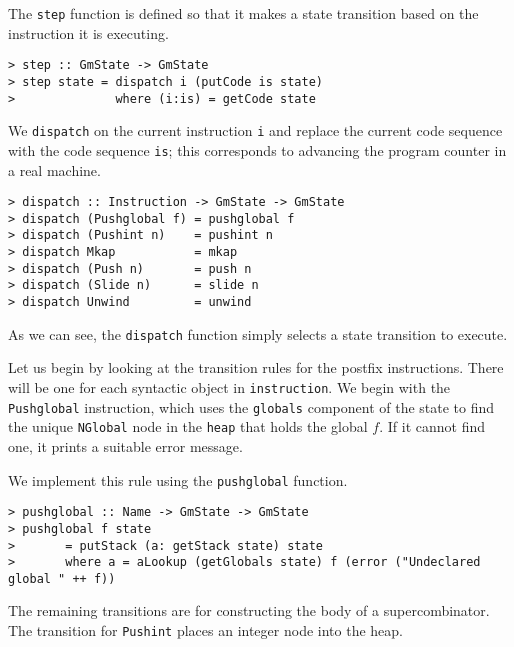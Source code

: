 The \mbox{\tt step} function is defined so that it makes a state transition
based on the instruction it is executing.
\begin{verbatim}
> step :: GmState -> GmState
> step state = dispatch i (putCode is state)
>              where (i:is) = getCode state
\end{verbatim}
%
%
\par
We \mbox{\tt dispatch} on the current instruction \mbox{\tt i} and replace the current
code sequence with the code sequence \mbox{\tt is}; this corresponds to
advancing the program counter in a real machine.
\begin{verbatim}
> dispatch :: Instruction -> GmState -> GmState
> dispatch (Pushglobal f) = pushglobal f
> dispatch (Pushint n)    = pushint n
> dispatch Mkap           = mkap
> dispatch (Push n)       = push n
> dispatch (Slide n)      = slide n
> dispatch Unwind         = unwind
\end{verbatim}
%
%
%
%
%
%
%
As we can see, the \mbox{\tt dispatch} function simply selects a state
transition to execute.

Let us begin by looking at the transition rules for the postfix
instructions. There will be one for each syntactic object in
\mbox{\tt instruction}. We begin with the \mbox{\tt Pushglobal} instruction, which uses the
\mbox{\tt globals} component of the state to find the unique \mbox{\tt NGlobal} node in the
\mbox{\tt heap} that holds the global $f$. If it cannot find one, it prints a
suitable error message.

\gmrule%
{}%
{}

We implement this rule using the \mbox{\tt pushglobal} function.
\begin{verbatim}
> pushglobal :: Name -> GmState -> GmState
> pushglobal f state
>       = putStack (a: getStack state) state
>       where a = aLookup (getGlobals state) f (error ("Undeclared global " ++ f))
\end{verbatim}
%
%
\par
The remaining transitions are for constructing the body of a
supercombinator. The transition for \mbox{\tt Pushint} places an integer node
into the heap.


